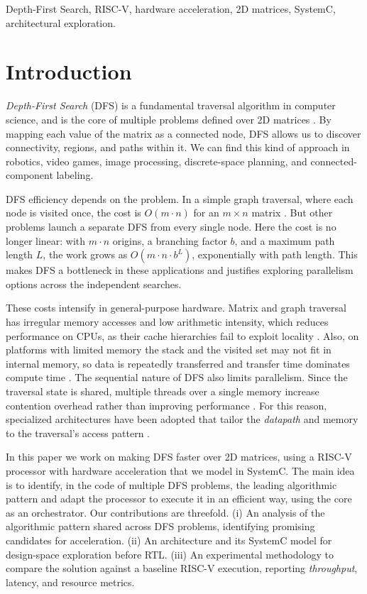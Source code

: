 \documentclass[conference]{IEEEtran}
\begin{document}
\begin{IEEEkeywords}
Depth-First Search, RISC-V, hardware acceleration, 2D matrices, SystemC,
architectural exploration.
\end{IEEEkeywords}

\section{Introduction}

\textit{Depth-First Search} (DFS) is a fundamental traversal algorithm in
computer science, and is the core of multiple problems defined over 2D matrices
\cite{datacamp_dfs}. By mapping each value of the matrix as a connected node,
DFS allows us to discover connectivity, regions, and paths within it. We can
find this kind of approach in robotics, video games, image processing,
discrete-space planning, and connected-component labeling.

DFS efficiency depends on the problem. In a simple graph traversal, where each
node is visited once, the cost is $O(m \cdot n)$ for an $m \times n$ matrix
\cite{datacamp_dfs}. But other problems launch a separate DFS from every single node. Here the cost is no longer linear: with
$m \cdot n$ origins, a branching factor $b$, and a maximum path length $L$, the
work grows as $O(m \cdot n \cdot b^{L})$, exponentially with path length. This
makes DFS a bottleneck in these applications and justifies exploring parallelism
options across the independent searches.

These costs intensify in general-purpose hardware. Matrix and graph traversal
has irregular memory accesses and low arithmetic intensity, which reduces
performance on CPUs, as their cache hierarchies fail to exploit locality
\cite{giorgi2023, dann2021}. Also, on platforms with limited memory the stack
and the visited set may not fit in internal memory, so data is repeatedly
transferred and transfer time dominates compute time \cite{giorgi2023}. The
sequential nature of DFS also limits parallelism. Since the traversal state is
shared, multiple threads over a single memory increase contention overhead
rather than improving performance \cite{giorgi2023}. For this reason,
specialized architectures have been adopted that tailor the \textit{datapath}
and memory to the traversal's access pattern \cite{dann2021}.

In this paper we work on making DFS faster over 2D matrices, using a RISC-V
processor with hardware acceleration that we model in SystemC. The main idea is to identify, in the code of multiple DFS problems, the leading
algorithmic pattern and adapt the processor to execute it in an efficient way,
using the core as an orchestrator. Our contributions are threefold. (i) An analysis of the algorithmic pattern
shared across DFS problems, identifying promising candidates for acceleration.
(ii) An architecture and its SystemC model for design-space exploration before
RTL. (iii) An experimental methodology to compare the solution against a
baseline RISC-V execution, reporting \textit{throughput}, latency, and resource
metrics.
\end{document}
